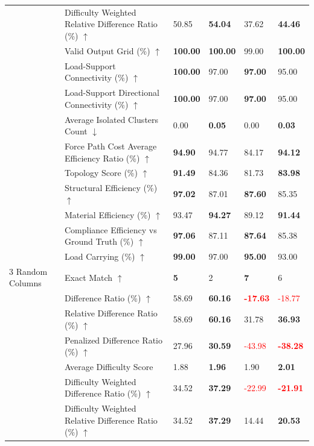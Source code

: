 \begin{table}[!h]
{\begin{tabular}{llll|ll}
 & Difficulty Weighted Relative Difference Ratio (\%) $\uparrow$ & 50.85 & \textbf{54.04} & 37.62 & \textbf{44.46} \\
 & Valid Output Grid (\%) $\uparrow$ & \textbf{100.00} & \textbf{100.00} & 99.00 & \textbf{100.00} \\
 & Load-Support Connectivity (\%) $\uparrow$ & \textbf{100.00} & 97.00 & \textbf{97.00} & 95.00 \\
 & Load-Support Directional Connectivity (\%) $\uparrow$ & \textbf{100.00} & 97.00 & \textbf{97.00} & 95.00 \\
 & Average Isolated Clusters Count $\downarrow$ & 0.00 & \textbf{0.05} & 0.00 & \textbf{0.03} \\
 & Force Path Cost Average Efficiency Ratio (\%) $\uparrow$ & \textbf{94.90} & 94.77 & 84.17 & \textbf{94.12} \\
 & Topology Score (\%) $\uparrow$ & \textbf{91.49} & 84.36 & 81.73 & \textbf{83.98} \\
 & Structural Efficiency (\%) $\uparrow$ & \textbf{97.02} & 87.01 & \textbf{87.60} & 85.35 \\
 & Material Efficiency (\%) $\uparrow$ & 93.47 & \textbf{94.27} & 89.12 & \textbf{91.44} \\
 & Compliance Efficiency vs Ground Truth (\%) $\uparrow$ & \textbf{97.06} & 87.11 & \textbf{87.64} & 85.38 \\
 & Load Carrying (\%) $\uparrow$ & \textbf{99.00} & 97.00 & \textbf{95.00} & 93.00 \\
\midrule
3 Random Columns & Exact Match $\uparrow$ & \textbf{5} & 2 & \textbf{7} & 6 \\
 & Difference Ratio (\%) $\uparrow$ & 58.69 & \textbf{60.16} & \textbf{\textcolor{red}{-17.63}} & \textcolor{red}{-18.77} \\
 & Relative Difference Ratio (\%) $\uparrow$ & 58.69 & \textbf{60.16} & 31.78 & \textbf{36.93} \\
 & Penalized Difference Ratio (\%) $\uparrow$ & 27.96 & \textbf{30.59} & \textcolor{red}{-43.98} & \textbf{\textcolor{red}{-38.28}} \\
 & Average Difficulty Score & 1.88 & \textbf{1.96} & 1.90 & \textbf{2.01} \\
 & Difficulty Weighted Difference Ratio (\%) $\uparrow$ & 34.52 & \textbf{37.29} & \textcolor{red}{-22.99} & \textbf{\textcolor{red}{-21.91}} \\
 & Difficulty Weighted Relative Difference Ratio (\%) $\uparrow$ & 34.52 & \textbf{37.29} & 14.44 & \textbf{20.53} \\

\end{tabular}}
\end{table}
